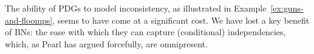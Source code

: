 \documentclass{article}
\numberwithin{equation}{section}
\begin{document}
		The ability of PDGs to model inconsistency, as illustrated in 
		Example~\ref{ex:guns-and-floomps}, seems to have come at a
		significant cost.
		We have lost a key benefit of BNs: the ease with which they can
capture (conditional) independencies,
which, as Pearl \parencite{pearl1989conditional} has argued forcefully,
are omnipresent.  

	
\end{document}
